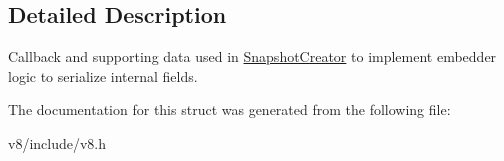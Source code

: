 \subsection{Detailed Description}
Callback and supporting data used in \mbox{\hyperlink{classv8_1_1SnapshotCreator}{Snapshot\+Creator}} to implement embedder logic to serialize internal fields. 

The documentation for this struct was generated from the following file\+:\begin{DoxyCompactItemize}
\item 
v8/include/v8.\+h\end{DoxyCompactItemize}
